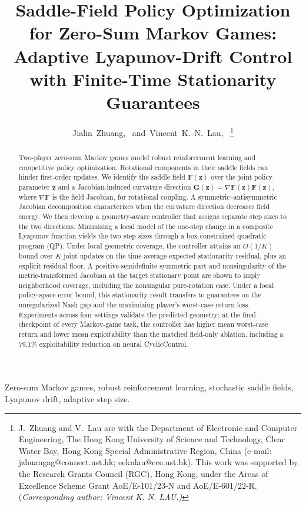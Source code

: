 \documentclass[journal]{IEEEtran}
\title{Saddle-Field Policy Optimization for Zero-Sum Markov Games: Adaptive Lyapunov-Drift Control with Finite-Time Stationarity Guarantees}
\author{Jialin~Zhuang,~\IEEEmembership{Member,~IEEE,}
	and~Vincent~K.~N.~Lau,~\IEEEmembership{Fellow,~IEEE}%
	\thanks{J.~Zhuang and V.~Lau are with the Department of Electronic and Computer Engineering, The Hong Kong University of Science and Technology, Clear Water Bay, Hong Kong Special Administrative Region, China (e-mail: jzhuangag@connect.ust.hk; eeknlau@ece.ust.hk).
		This work was supported by the Research Grants Council (RGC), Hong Kong, under the Areas of Excellence Scheme Grant AoE/E-101/23-N and AoE/E-601/22-R.
		(\em{Corresponding author: Vincent K. N. LAU}.)}
}
\theoremstyle{remark}
\newcommand{\bz}{\boldsymbol{z}}
\newcommand{\bF}{\boldsymbol{F}}
\newcommand{\bG}{\boldsymbol{G}}
\begin{document}
	\maketitle
	\setlength{\abovedisplayskip}{4pt plus 2pt minus 2pt}
	\setlength{\belowdisplayskip}{4pt plus 2pt minus 2pt}
	\setlength{\abovedisplayshortskip}{1pt plus 1pt}
	\setlength{\belowdisplayshortskip}{4pt plus 2pt minus 2pt}
	
	\begin{abstract}
		Two-player zero-sum Markov games model robust reinforcement learning and competitive policy optimization.
		Rotational components in their saddle fields can hinder first-order updates.
		We identify the saddle field $\bF(\bz)$ over the joint policy parameter $\bz$ and a Jacobian-induced curvature direction $\bG(\bz)=\nabla\bF(\bz)\bF(\bz)$, where $\nabla\bF$ is the field Jacobian, for rotational coupling.
		A symmetric--antisymmetric Jacobian decomposition characterizes when the curvature direction decreases field energy.
		We then develop a geometry-aware controller that assigns separate step sizes to the two directions.
		Minimizing a local model of the one-step change in a composite Lyapunov function yields the two step sizes through a box-constrained quadratic program (QP).
		Under local geometric coverage, the controller attains an $O(1/K)$ bound over $K$ joint updates on the time-average expected stationarity residual, plus an explicit residual floor.
		A positive-semidefinite symmetric part and nonsingularity of the metric-transformed Jacobian at the target stationary point are shown to imply neighborhood coverage, including the nonsingular pure-rotation case.
		Under a local policy-space error bound, this stationarity result transfers to guarantees on the unregularized Nash gap and the maximizing player's worst-case-return loss.
		Experiments across four settings validate the predicted geometry; at the final checkpoint of every Markov-game task, the controller has higher mean worst-case return and lower mean exploitability than the matched field-only ablation, including a $79.1\%$ exploitability reduction on neural CyclicControl.
	\end{abstract}
	
	\begin{IEEEkeywords}
		Zero-sum Markov games, robust reinforcement learning, stochastic saddle fields, Lyapunov drift, adaptive step size.
	\end{IEEEkeywords}
	
\end{document}
